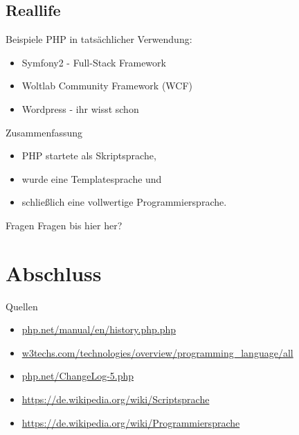 \documentclass{beamer}
\begin{document}
	\subsection{Reallife}
	\begin{frame}{Beispiele}
		PHP in tatsächlicher Verwendung:
		\begin{itemize}
			\item Symfony2 - Full-Stack Framework
			\item Woltlab Community Framework (WCF)
			\item Wordpress - ihr wisst schon
		\end{itemize}
	\end{frame}
	
	\begin{frame}{Zusammenfassung}
		\begin{itemize}
			\item PHP startete als Skriptsprache,
			\item<2-> wurde eine Templatesprache und
			\item<3-> schließlich eine vollwertige Programmiersprache.
		\end{itemize}
	\end{frame}
	
	\begin{frame}{Fragen}
		Fragen bis hier her?
	\end{frame}
	
	\section{Abschluss}
	\begin{frame}{Quellen}
		\begin{itemize}
			\item \url{php.net/manual/en/history.php.php}
			\item \url{w3techs.com/technologies/overview/programming_language/all}
			\item \url{php.net/ChangeLog-5.php}
			\item \url{https://de.wikipedia.org/wiki/Scriptsprache}
			\item \url{https://de.wikipedia.org/wiki/Programmiersprache}
		\end{itemize}
	\end{frame}
	
\end{document}
